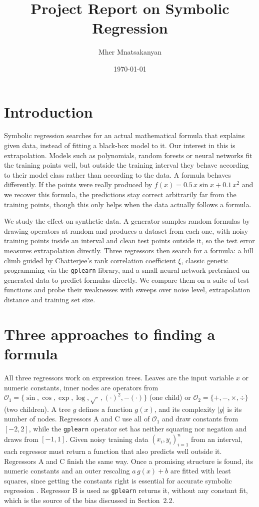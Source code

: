 \documentclass{article}
\title{Project Report on Symbolic Regression}
\author{Mher Mnatsakanyan}
\date{\today}
\begin{document}
\maketitle

\section{Introduction}

Symbolic regression searches for an actual mathematical formula that
explains given data, instead of fitting a black-box model to it. Our
interest in this is extrapolation. Models such as polynomials, random
forests or neural networks fit the training points well, but outside the
training interval they behave according to their model class rather than
according to the data. A formula behaves differently. If the points were
really produced by $f(x) = 0.5\,x \sin x + 0.1\,x^2$ and we recover this
formula, the predictions stay correct arbitrarily far from the training
points, though this only helps when the data actually follows a formula.

We study the effect on synthetic data. A generator samples random
formulas by drawing operators at random and produces a dataset from each
one, with noisy training points inside an interval and clean test points
outside it, so the test error measures extrapolation directly. Three
regressors then search for a formula: a hill climb guided by
Chatterjee's rank correlation coefficient $\xi$, classic genetic
programming via the \texttt{gplearn} library, and a small neural network
pretrained on generated data to predict formulas directly. We compare
them on a suite of test functions and probe their weaknesses with sweeps
over noise level, extrapolation distance and training set size.

\section{Three approaches to finding a formula}

All three regressors work on expression trees. Leaves are the input
variable $x$ or numeric constants, inner nodes are operators from
$\mathcal{O}_1 = \{\sin, \cos, \exp, \log, \sqrt{\cdot}\,, (\cdot)^2, -(\cdot)\}$
(one child) or $\mathcal{O}_2 = \{+, -, \times, \div\}$ (two children). A
tree $g$ defines a function $g(x)$, and its complexity $|g|$ is its
number of nodes. Regressors A and C use all of $\mathcal{O}_1$ and draw
constants from $[-2,2]$, while the \texttt{gplearn} operator set has
neither squaring nor negation and draws from $[-1,1]$. Given noisy
training data $(x_i, y_i)_{i=1}^n$ from an interval, each regressor must
return a function that also predicts well outside it. Regressors A and C
finish the same way. Once a promising structure is found, its numeric
constants and an outer rescaling $a\,g(x)+b$ are fitted with least
squares, since getting the constants right is essential for accurate
symbolic regression \citep{cranmer2023interpretablemachinelearningscience}. Regressor B is used as \texttt{gplearn}
returns it, without any constant fit, which is the source of the bias
discussed in Section~2.2.
\end{document}
